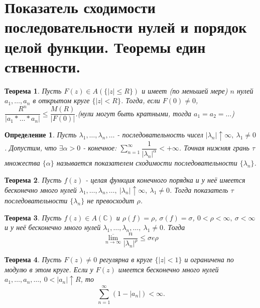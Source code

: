 \documentclass[9pt]{article}
\newtheorem{theorem}{Теорема} %
\newtheorem{definition}{Определение}
\begin{document}
	\section{ Показатель сходимости последовательности нулей и порядок целой функции. Теоремы един
		ственности.}
		\begin{theorem}
			Пусть $F(z) \in A(\{|z| \leq R\})$ и имеет (по меньшей мере) $n$ нулей $a_1, \dots, a_n$ в открытом круге $\{|z| < R\}$. Тогда, если $F(0) \neq 0$, $\dfrac{R^n}{|a_1 * \dots * a_n|} \leq \dfrac{M(R)}{|F(0)|}$.(нули могут быть кратными, тогда $a_1 = a_2 = \dots$)
		\end{theorem}
		\begin{definition}
			Пусть $\lambda_1, \dots, \lambda_n, \dots$  - последовательность чисел $|\lambda_n|\uparrow \infty, \ \lambda_1 \neq 0$. Допустим, что $\exists \alpha > 0$ - конечное: $\sum\limits_{n=1}^{\infty} \dfrac{1}{|\lambda_n|^\alpha} < +\infty$. Точная нижняя грань $\tau$ множества $\{\alpha\}$ называется показателем сходимости последовательности $\{\lambda_n\}$.
		\end{definition}
		\begin{theorem}
			Пусть $f(z)$ - целая функция конечного порядка и у неё имеется бесконечно много нулей $\lambda_1, \dots, \lambda_n, \dots, \ |\lambda_n| \uparrow \infty, \ \lambda_1 \neq 0$. Тогда показатель $\tau$ последовательности $\{\lambda_n\}$ не превосходит $\rho$.
		\end{theorem}
		\begin{theorem}
			Пусть $f(z) \in A(\mathbb{C})$ и $\rho(f) = \rho$, $\sigma(f) = \sigma$, $0 < \rho < \infty, \ \sigma < \infty$ и у неё бесконечно много нулей $\lambda_1, \dots, \lambda_n, \dots, \ \lambda_1 \neq 0$. Тогда 
			$$
			\overline{\lim\limits_{n\to\infty}} \dfrac{n}{|\lambda_n|^\rho} \leq \sigma e\rho
			$$
		\end{theorem}
		\begin{theorem}
			Пусть $F(z) \neq 0$ регулярна в круге $\{|z| < 1\}$ и ограничена по модулю в этом круге. Если у $F(z)$ имеется бесконечно много нулей $a_1, \dots , a_n, \dots, \ 0 < |a_n| \uparrow R$, то 
			$$
			\sum\limits_{n=1}^{\infty} \left(1 - |a_n|\right) < \infty.
			$$
		\end{theorem}
\end{document}
